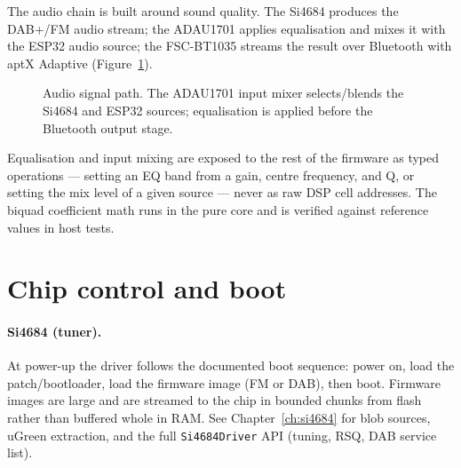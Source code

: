 The audio chain is built around sound quality. The Si4684 produces the
DAB+/FM audio stream; the ADAU1701 applies equalisation and mixes it
with the ESP32 audio source; the FSC-BT1035 streams the result over
Bluetooth with aptX Adaptive (Figure~\ref{fig:fw-audio}).

\begin{figure}[htbp]
  \centering
  \caption{Audio signal path. The ADAU1701 input mixer selects/blends
    the Si4684 and ESP32 sources; equalisation is applied before the
    Bluetooth output stage.}
  \label{fig:fw-audio}
\end{figure}

Equalisation and input mixing are exposed to the rest of the firmware as
typed operations --- setting an EQ band from a gain, centre frequency,
and Q, or setting the mix level of a given source --- never as raw DSP
cell addresses. The biquad coefficient math runs in the pure core and is
verified against reference values in host tests.

\section{Chip control and boot}
\label{sec:fw-chips}

\paragraph{Si4684 (tuner).}
At power-up the driver follows the documented boot sequence: power on,
load the patch/bootloader, load the firmware image (FM or DAB), then
boot. Firmware images are large and are streamed to the chip in bounded
chunks from flash rather than buffered whole in RAM. See
Chapter~\ref{ch:si4684} for blob sources, uGreen extraction, and the full
\texttt{Si4684Driver} API (tuning, RSQ, DAB service list).


